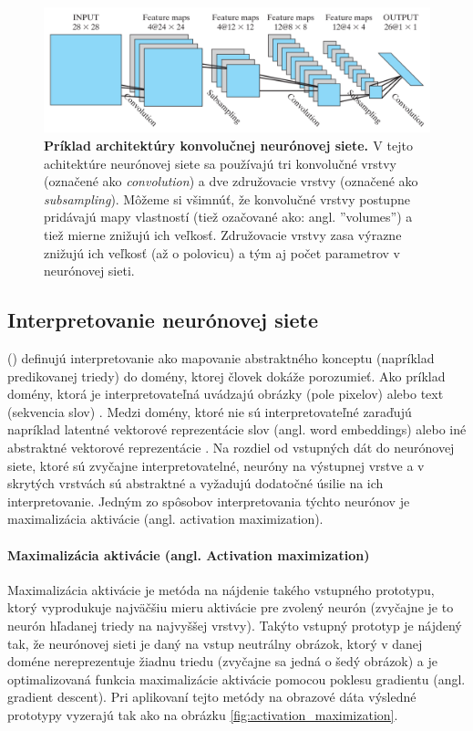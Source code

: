 \begin{figure}[h!]
    \centering
    \includegraphics[width=12cm]{assets/images/conv_net_architecture.png}
    \caption{\textbf{Príklad architektúry konvolučnej neurónovej siete. \cite{haykin2009neural}} V tejto achitektúre neurónovej siete sa používajú tri konvolučné vrstvy (označené ako \textit{convolution}) a dve združovacie vrstvy (označené ako \textit{subsampling}). Môžeme si všimnúť, že konvolučné vrstvy postupne pridávajú mapy vlastností (tiež ozačované ako: angl. ''volumes'') a tiež mierne znižujú ich veľkosť. Združovacie vrstvy zasa výrazne znižujú ich veľkosť (až o polovicu) a tým aj počet parametrov v neurónovej sieti.}
    \label{fig:conv_net_architecture}
\end{figure}

\subsection{Interpretovanie neurónovej siete}

\citeauthor{montavon2018methods} (\citeyear{montavon2018methods}) definujú interpretovanie ako mapovanie abstraktného konceptu (napríklad predikovanej triedy) do domény, ktorej človek dokáže porozumieť. Ako príklad domény, ktorá je interpretovateľná uvádzajú obrázky (pole pixelov) alebo text (sekvencia slov) \cite{montavon2018methods}. Medzi domény, ktoré nie sú interpretovateľné zaraďujú napríklad latentné vektorové reprezentácie slov (angl. word embeddings) alebo iné abstraktné vektorové reprezentácie \cite{montavon2018methods}.
Na rozdiel od vstupných dát do neurónovej siete, ktoré sú zvyčajne interpretovatelné, neuróny na výstupnej vrstve a v skrytých vrstvách sú abstraktné a vyžadujú dodatočné úsilie na ich interpretovanie. Jedným zo spôsobov interpretovania týchto neurónov je maximalizácia aktivácie (angl. activation maximization).

\paragraph{Maximalizácia aktivácie (angl. Activation maximization)}
Maximalizácia aktivácie je metóda na nájdenie takého vstupného prototypu, ktorý vyprodukuje najväčšiu mieru aktivácie pre zvolený neurón (zvyčajne je to neurón hľadanej triedy na najvyššej vrstvy). 
Takýto vstupný prototyp je nájdený tak, že neurónovej sieti je daný na vstup neutrálny obrázok, ktorý v danej doméne nereprezentuje žiadnu triedu (zvyčajne sa jedná o šedý obrázok) a je optimalizovaná funkcia maximalizácie aktivácie pomocou poklesu gradientu \cite{montavon2018methods} (angl. gradient descent). Pri aplikovaní tejto metódy na obrazové dáta výsledné prototypy vyzerajú tak ako na obrázku \ref{fig:activation_maximization}.

